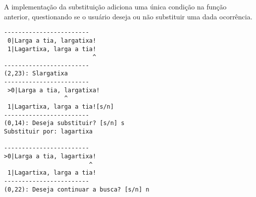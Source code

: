 \documentclass[a4paper, 11pt]{article}
\begin{document}
A implementação da substituição adiciona uma única condição na função anterior, questionando se o usuário deseja ou não substituir uma dada ocorrência.
\begin{center}
\begin{minipage}[t]{0.8\linewidth}
\begin{lstlisting}[caption={Exemplo de Substituição}, label={list_exemplo_de_substituicao}, language={[ansi]C},firstnumber=1]
------------------------
 0|Larga a tia, largatixa!
 1|Lagartixa, larga a tia!
                         ^
------------------------
(2,23): Slargatixa
------------------------
 >0|Larga a tia, largatixa!
                 ^
 1|Lagartixa, larga a tia![s/n]
------------------------
(0,14): Deseja substituir? [s/n] s
Substituir por: lagartixa

------------------------
>0|Larga a tia, lagartixa!
                        ^
 1|Lagartixa, larga a tia!
------------------------
(0,22): Deseja continuar a busca? [s/n] n
\end{lstlisting}
\end{minipage}
\end{center}
\end{document}
